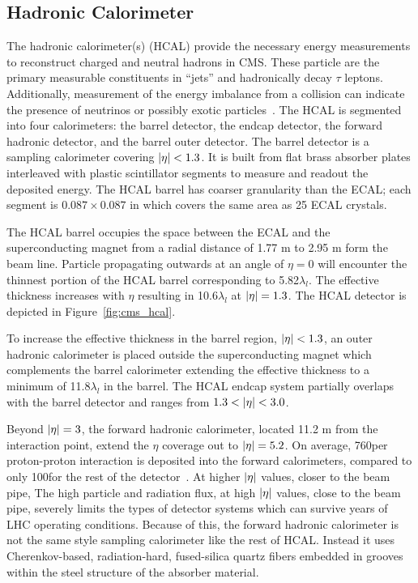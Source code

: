 \subsection{Hadronic Calorimeter}
The hadronic calorimeter(s) (HCAL) provide the necessary energy measurements
to reconstruct charged and neutral hadrons in CMS. These particle are the
primary measurable constituents in ``jets'' and hadronically decay $\tau$
leptons. Additionally, measurement of the energy imbalance from a collision
can indicate the presence of neutrinos or possibly exotic particles~\cite{CMS-Proposal}.
The HCAL is segmented into four calorimeters: the barrel detector, the endcap detector,
the forward hadronic detector, and the barrel outer detector. 
The barrel detector is a sampling calorimeter covering $\lvert\eta\rvert < 1.3$. It is built
from flat brass absorber plates interleaved with plastic scintillator segments to
measure and readout the deposited energy. The HCAL barrel has coarser granularity
than the ECAL; each segment is $0.087 \times 0.087$ in \etaphi which covers the
same area as 25 ECAL crystals.

The HCAL barrel occupies the space between the ECAL and the superconducting magnet
from a radial distance of 1.77 m to 2.95 m form the beam line. Particle propagating
outwards at an angle of $\eta = 0$ will encounter the thinnest portion of the
HCAL barrel corresponding to 5.82$\lambda_{l}$. The effective thickness increases
with $\eta$ resulting in 10.6$\lambda_{l}$ at $\lvert\eta\rvert = 1.3$. The HCAL detector
is depicted in Figure~\ref{fig:cms_hcal}.

To increase the effective
thickness in the barrel region, $\lvert\eta\rvert < 1.3$, an outer hadronic calorimeter is placed 
outside the superconducting magnet which complements the barrel calorimeter
extending the effective thickness to a minimum of 11.8$\lambda_{l}$ in the barrel. 
The HCAL endcap system partially overlaps with the barrel detector and ranges from
$1.3 < \lvert\eta\rvert < 3.0$.

Beyond $\lvert\eta\rvert = 3$, the forward hadronic calorimeter, located
11.2 m from the interaction point, extend the $\eta$ coverage out to $\lvert\eta\rvert = 5.2$.
On average, 760\GeV per proton-proton interaction is deposited into the forward 
calorimeters, compared to only 100\GeV for the rest of the detector~\cite{Chatrchyan:2008zzk}.
At higher $\lvert\eta\rvert$ values, closer to the beam pipe, 
The high particle and radiation flux, at high $\lvert\eta\rvert$ values, close to the beam pipe,
severely limits the types of detector systems which can survive years of LHC operating
conditions. Because of this, the forward hadronic calorimeter is not the same style sampling
calorimeter like the rest of HCAL. Instead it uses Cherenkov-based, 
radiation-hard, fused-silica quartz fibers embedded in grooves within the steel structure
of the absorber material.

